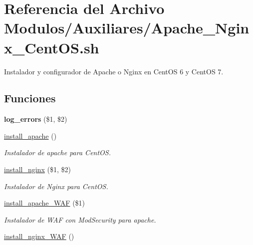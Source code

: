 \hypertarget{Apache__Nginx__CentOS_8sh}{}\section{Referencia del Archivo Modulos/\+Auxiliares/\+Apache\+\_\+\+Nginx\+\_\+\+Cent\+OS.sh}
\label{Apache__Nginx__CentOS_8sh}


Instalador y configurador de Apache o Nginx en Cent\+OS 6 y Cent\+OS 7.  


\subsection*{Funciones}
\begin{DoxyCompactItemize}
\item 
\mbox{\label{Apache__Nginx__CentOS_8sh_a92067b58a8478c9841b2cd9b75ea3565}} 
{\bfseries log\+\_\+errors} (\$1, \$2)
\item 
\mbox{\label{Apache__Nginx__CentOS_8sh_a01b71b7f26483d8d7d7a77c41884a3c3}} 
\hyperlink{Apache__Nginx__CentOS_8sh_a01b71b7f26483d8d7d7a77c41884a3c3}{install\+\_\+apache} ()
\begin{DoxyCompactList}\small\item\em Instalador de apache para Cent\+OS. \end{DoxyCompactList}\item 
\hyperlink{Apache__Nginx__CentOS_8sh_a7a8a87a6c379ba1d79a4ad2c2608ed86}{install\+\_\+nginx} (\$1, \$2)
\begin{DoxyCompactList}\small\item\em Instalador de Nginx para Cent\+OS. \end{DoxyCompactList}\item 
\hyperlink{Apache__Nginx__CentOS_8sh_a7a45cf4f454e9ef11157535c09cbddd9}{install\+\_\+apache\+\_\+\+W\+AF} (\$1)
\begin{DoxyCompactList}\small\item\em Instalador de W\+AF con Mod\+Security para apache. \end{DoxyCompactList}\item 
\mbox{\label{Apache__Nginx__CentOS_8sh_a552037508bacb63920867eb5812186cd}} 
\hyperlink{Apache__Nginx__CentOS_8sh_a552037508bacb63920867eb5812186cd}{install\+\_\+nginx\+\_\+\+W\+AF} ()

\end{DoxyCompactItemize}
